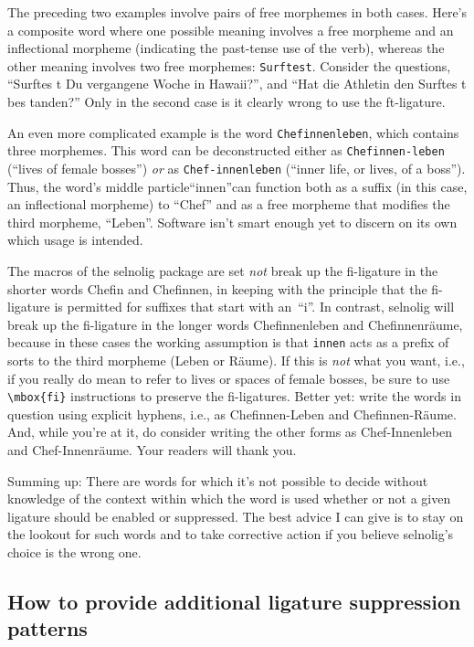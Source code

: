 \documentclass[11pt]{article}
\newcommand{\pkg}[1]{\textsf{#1}}
\newcommand{\opt}[1]{\texttt{#1}}
\begin{document}
The preceding two examples involve pairs of free morphemes in both cases. Here's a composite word where one possible meaning involves a free morpheme and an inflectional morpheme (indicating the past-tense use of the verb), whereas the other meaning involves two free morphemes: \opt{Surftest}. Consider the questions, \enquote{Surftes\kern0pt t Du vergangene Woche in Hawaii?}, and \enquote{Hat die Athletin den Surf\breaklig tes\kern0pt t bes\kern0pt tanden?} Only in the second case is it clearly wrong to use the ft-ligature.

An even more complicated example is the word \opt{Chefinnenleben}, which contains three morphemes. This word can be deconstructed either as \opt{Chefinnen-leben} (\enquote{lives of female bosses}) \emph{or} as \opt{Chef-innenleben} (\enquote{inner life, or lives, of a boss}). Thus, the word's middle particle\textemdash\enquote{innen}\textemdash can function both as a suffix (in this case, an inflectional morpheme) to \enquote{Chef} and as a free morpheme that modifies the third morpheme, \enquote{Leben}. Software isn't smart enough yet to discern on its own which usage is intended.

The macros of the \pkg{selnolig} package are set \emph{not} break up the fi-ligature in the shorter words Chefin and Chefinnen, in keeping with the principle that the fi-ligature is permitted for suffixes that start with an~\enquote{i}. In contrast, \pkg{selnolig} will break up the fi-ligature in the longer words Chefinnenleben and Chefinnenräume, because in these cases the working assumption is that \opt{innen} acts as a prefix of sorts to the third morpheme (Leben or Räume). If this is \emph{not} what you want, i.e., if you really do mean to refer to lives or spaces of female bosses, be sure to use \Verb+\mbox{fi}+ instructions to preserve the fi-ligatures. Better yet: write the words in question using explicit hyphens, i.e., as Chefinnen-Leben and Chefinnen-Räume. And, while you're at it, do consider writing the other forms as Chef-Innenleben and Chef-Innenräume. Your readers will thank you.

Summing up: There are words for which it's not possible to decide without knowledge of the context within which the word is used whether or not a given ligature should be enabled or suppressed. The best advice I can give is to stay on the lookout for such words and to take corrective action if you believe \pkg{selnolig}'s choice is the wrong one.



\subsection{How to provide additional ligature suppression patterns}
\end{document}
